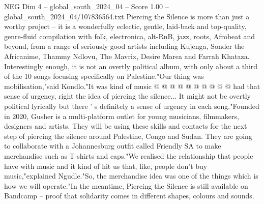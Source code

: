\begin{textsample}{NEG Dim 4 – global\_south\_2024\_04 – Score 1.00 – global\_south\_2024\_04/107836564.txt}
Piercing the Silence is more than just a worthy project -- it is a wonderfully eclectic, gentle, laid-back and top-quality, genre-fluid compilation with folk, electronica, alt-RnB, jazz, roots, Afrobeat and beyond, from a range of seriously good artists including Kujenga, Sonder the Africanime, Thammy Ndlovu, The Mavrix, Desire Marea and Farrah Khataza.
Interestingly enough, it is not an overtly political album, with only about a third of the 10 songs focusing specifically on Palestine."Our thing was mobilisation,"said Kondlo."It was kind of music @ @ @ @ @ @ @ @ @ @ had that sense of urgency, right the idea of piercing the silence...
It might not be overtly political lyrically but there ' s definitely a sense of urgency in each song."Founded in 2020, Gusher is a multi-platform outlet for young musicians, filmmakers, designers and artists.
They will be using these skills and contacts for the next step of piercing the silence around Palestine, Congo and Sudan.
They are going to collaborate with a Johannesburg outfit called Friendly SA to make merchandise such as T-shirts and caps."We realised the relationship that people have with music and it kind of hit us that, like, people don't buy music,"explained Ngudle."So, the merchandise idea was one of the things which is how we will operate."In the meantime, Piercing the Silence is still available on Bandcamp -- proof that solidarity comes in different shapes, colours and sounds.

\end{textsample}
